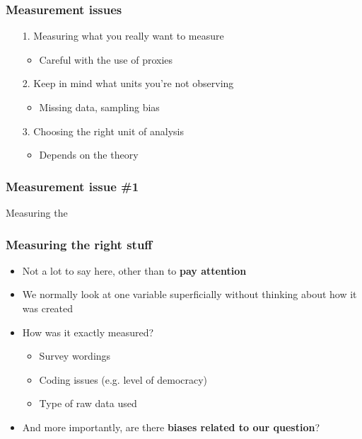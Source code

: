 \documentclass[aspectratio=43]{beamer}
\begin{document}
\begin{frame}
\frametitle{Measurement issues}
\centering

\begin{itemize}
  \item[1.] Measuring what you really want to measure
  \begin{itemize}
    \item Careful with the use of proxies
  \end{itemize}
  \item[2.] Keep in mind what units you're not observing
  \begin{itemize}
    \item Missing data, sampling bias
  \end{itemize}
  \item[3.] Choosing the right unit of analysis
  \begin{itemize}
    \item Depends on the theory
  \end{itemize}
\end{itemize}

\end{frame}

\begin{frame}
\frametitle{Measurement issue \#1}
\centering

Measuring the 

\end{frame}
  

\begin{frame}
\frametitle{Measuring the right stuff}
\centering

\begin{itemize}
  \item Not a lot to say here, other than to \textbf{pay attention}
  \item We normally look at one variable superficially without thinking about how it was created
  \item How was it exactly measured?
  \begin{itemize}
    \item Survey wordings
    \item Coding issues (e.g. level of democracy)
    \item Type of raw data used
  \end{itemize}
  \item And more importantly, are there \textbf{biases related to our question}?
\end{itemize}

\end{frame}
\end{document}
